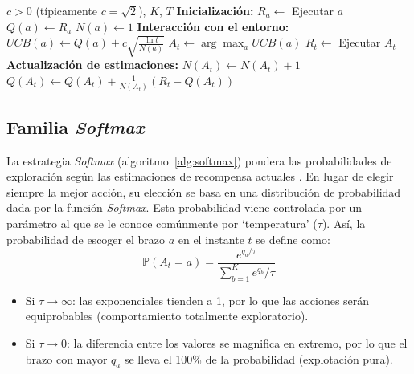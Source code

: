 \begin{algorithm}[H]
\caption{Algoritmo UCB1 (Upper Confidence Bound)}
\label{alg:ucb1}
\begin{algorithmic}[1]
\Require $c > 0$ (típicamente $c = \sqrt{2}$), $K$, $T$
\State \textbf{Inicialización:}
    \State $R_a \leftarrow $ Ejecutar $a$
    \State $Q(a) \leftarrow R_a$  
    \State $N(a) \leftarrow 1$ 
\EndFor
\State \textbf{Interacción con el entorno:}
        \State $UCB(a) \leftarrow Q(a) + c \sqrt{\frac{\ln t}{N(a)}}$
    \EndFor
    \State $A_t \leftarrow \arg\max_{a} UCB(a)$ 
    \State $R_t \leftarrow$ Ejecutar $A_t$ 
    \State \textbf{Actualización de estimaciones:}
    \State $N(A_t) \leftarrow N(A_t) + 1$
    \State $Q(A_t) \leftarrow Q(A_t) + \frac{1}{N(A_t)} \left( R_t - Q(A_t) \right)$
\EndFor
\end{algorithmic}
\end{algorithm}
\vspace{-15pt}

\subsection{Familia \textit{Softmax}}

La estrategia \textit{Softmax} (algoritmo~\ref{alg:softmax}) pondera las probabilidades de exploración según las estimaciones de recompensa actuales \cite{luce1959}. En lugar de elegir siempre la mejor acción, su elección se basa en una distribución de probabilidad dada por la función \textit{Softmax}. Esta probabilidad viene controlada por un parámetro al que se le conoce comúnmente por `temperatura' ($\tau$). Así, la probabilidad de escoger el brazo $a$ en el instante $t$ se define como:
$$\mathbb{P}(A_t=a)=\frac{e^{q_a/\tau}}{\sum^K_{b=1}e^{q_b}/\tau}$$
\begin{itemize}
    \item Si $\tau \rightarrow \infty$: las exponenciales tienden a 1, por lo que las acciones serán equiprobables (comportamiento totalmente exploratorio).
    \item Si $\tau \rightarrow 0$: la diferencia entre los valores se magnifica en extremo, por lo que el brazo con mayor $q_a$ se lleva el 100\% de la probabilidad (explotación pura).
\end{itemize}


